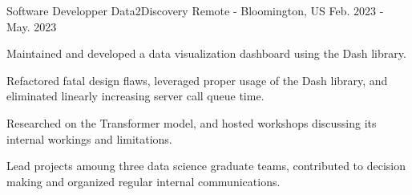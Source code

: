 

\begin{cventries}

  \cventry
    {Software Developper} %
    {Data2Discovery} %
    {Remote - Bloomington, US} %
    {Feb. 2023 - May. 2023} %
    {
      \begin{cvitems} %
        \item {Maintained and developed a data visualization dashboard using the Dash library.}
        \item {Refactored fatal design flaws, leveraged proper usage of the Dash library, and eliminated linearly increasing server call queue time.}
        \item {Researched on the Transformer model, and hosted workshops discussing its internal workings and limitations.}
        \item {Lead projects amoung three data science graduate teams, contributed to decision making and organized regular internal communications.}
      \end{cvitems}
    }

\end{cventries}
